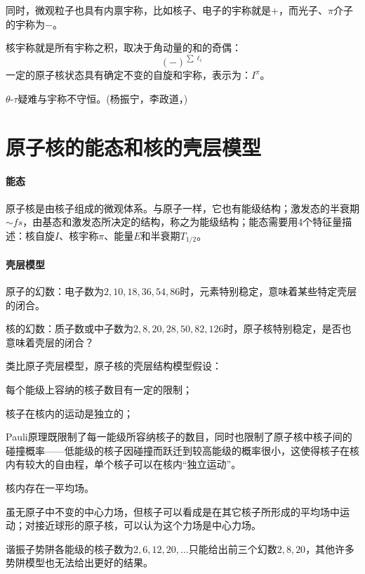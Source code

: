 同时，微观粒子也具有内禀宇称，比如核子、电子的宇称就是$+$，而光子、$\pi$介子的宇称为$-$。

核宇称就是所有宇称之积，取决于角动量的和的奇偶：
\[
	(-)^{\sum\ell_i}
\]
一定的原子核状态具有确定不变的自旋和宇称，表示为：$I^\pi$。

$\theta$-$\tau$疑难与宇称不守恒。(杨振宁，李政道，)

\section{原子核的能态和核的壳层模型}

\paragraph{能态}原子核是由核子组成的微观体系。与原子一样，它也有能级结构；激发态的半衰期$\sim\si{fs}$，由基态和激发态所决定的结构，称之为能级结构；能态需要用4个特征量描述：核自旋$I$、核宇称$\pi$、能量$E$和半衰期$T_{1/2}$。
\begin{center}
\end{center}
\paragraph{壳层模型}原子的幻数：电子数为$2,10,18,36,54,86$时，元素特别稳定，意味着某些特定壳层的闭合。

核的幻数：质子数或中子数为$2,8,20,28,50,82,126$时，原子核特别稳定，是否也意味着壳层的闭合？

类比原子壳层模型，原子核的壳层结构模型假设：
\begin{compactenum}
	\item 每个能级上容纳的核子数目有一定的限制；
	\item 核子在核内的运动是独立的；

	Pauli原理既限制了每一能级所容纳核子的数目，同时也限制了原子核中核子间的碰撞概率——低能级的核子因碰撞而跃迁到较高能级的概率很小，这使得核子在核内有较大的自由程，单个核子可以在核内“独立运动”。
	\item 核内存在一平均场。

	虽无原子中不变的中心力场，但核子可以看成是在其它核子所形成的平均场中运动；对接近球形的原子核，可以认为这个力场是中心力场。
\end{compactenum}
谐振子势阱各能级的核子数为$2,6,12,20,\ldots$只能给出前三个幻数$2,8,20$，其他许多势阱模型也无法给出更好的结果。

